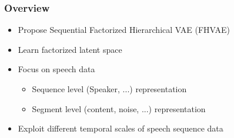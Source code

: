 \documentclass[9pt]{beamer}
\begin{document}
\begin{frame}
\frametitle{Overview}
\begin{itemize}%
	\item Propose Sequential Factorized Hierarchical VAE (FHVAE)
	\item Learn factorized latent space
	\item Focus on speech data
	\begin{itemize}
		\item Sequence level (Speaker, ...) representation
		\item Segment level (content, noise, ...) representation
	\end{itemize}
	\item Exploit different temporal scales of speech sequence data
\end{itemize}
\end{frame} 
\end{document}
